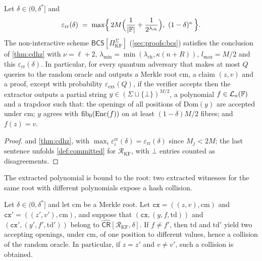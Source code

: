 \begin{corollary}\label{cor:pq}
Let $\delta \in (0,\delta^*]$ and
\[
  \varepsilon_{\mathrm{rr}}(\delta) \;=\; \max\Bigl\{\, 2M\Bigl(\frac{1}{|\mathbb{F}|} + \frac{1}{2^{\lambda_{\mathrm{ch}}}}\Bigr),\ (1-\delta)^\kappa \,\Bigr\}.
\]
The non-interactive scheme $\mathsf{BCS}[\Pi^\Sigma_{\mathrm{KF}}]$ (\cref{sec:proofs:bcs}) satisfies the conclusion of \cref{thm:cdhz} with $\nu = \ell + 2$, $\lambda_{\min} = \min(\lambda_{\mathrm{ch}}, \kappa(n+R))$, $l_{\max} = M/2$ and this $\varepsilon_{\mathrm{rr}}(\delta)$.
In particular, for every quantum adversary that makes at most $Q$ queries to the random oracle and outputs a Merkle root $\mathrm{cm}$, a claim $(z,v)$ and a proof, except with probability $\varepsilon_{\mathrm{ext}}(Q)$, if the verifier accepts then the extractor outputs a partial string $y \in (\Sigma \sqcup \{\bot\})^{M/2}$, a polynomial $f \in \mathcal{L}_n(\mathbb{F})$ and a trapdoor such that:
the openings of all positions of $\mathrm{Dom}(y)$ are accepted under $\mathrm{cm}$; $y$ agrees with $\mathrm{fib}_0(\mathrm{Enc}(f))$ on at least $(1-\delta)M/2$ fibres; and $f(z) = v$.
\end{corollary}

\begin{proof}
 and \cref{thm:cdhz}, with $\max_i \varepsilon^{\mathrm{rr}}_i(\delta) = \varepsilon_{\mathrm{rr}}(\delta)$ since $M_j < 2M$; the last sentence unfolds \cref{def:committed} for $\mathcal{R}_{\mathrm{KF}}$, with $\bot$ entries counted as disagreements.
\end{proof}

The extracted polynomial is bound to the root: two extracted witnesses for the same root with different polynomials expose a hash collision.

\begin{lemma}\label{lem:cr-unique}
Let $\delta \in (0,\delta^*]$ and let $\mathrm{cm}$ be a Merkle root. Let $\mathtt{cx} = ((z,v),\mathrm{cm})$ and $\mathtt{cx}' = ((z',v'),\mathrm{cm})$, and suppose that $(\mathtt{cx}, (y,f,\mathrm{td}))$ and $(\mathtt{cx}', (y',f',\mathrm{td}'))$ belong to $\widehat{\mathsf{CR}}[\mathcal{R}_{\mathrm{KF}}, \delta]$.
If $f \ne f'$, then $\mathrm{td}$ and $\mathrm{td}'$ yield two accepting openings, under $\mathrm{cm}$, of one position to different values, hence a collision of the random oracle.
In particular, if $z = z'$ and $v \ne v'$, such a collision is obtained.
\end{lemma}

